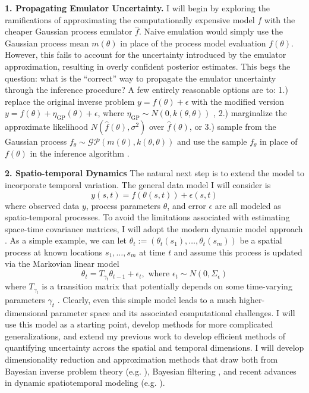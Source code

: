 \documentclass[12pt]{article}
\begin{document}
 \textbf{1. Propagating Emulator Uncertainty.} I will begin by exploring the ramifications of approximating the computationally expensive model $f$ with the  cheaper Gaussian process emulator $\hat{f}$. Naive emulation would simply use the Gaussian process mean $m(\theta)$ in place of the process model evaluation $f(\theta)$. However, this fails to account
 for the uncertainty introduced by the emulator approximation, resulting in overly confident posterior estimates. This begs the question: what is the ``correct'' way to propagate the emulator uncertainty through 
 the inference procedure? A few entirely reasonable options are to: 1.) replace the original inverse problem $y = f(\theta) + \epsilon$ with the modified version $y = f(\theta) + \eta_{\text{GP}}(\theta) + \epsilon$, 
 where $\eta_{\text{GP}} \sim N(0, k(\theta, \theta))$ \cite{Cleary}, 2.) marginalize the approximate likelihood $N(\hat{f}(\theta), \sigma^2)$ over $\hat{f}(\theta)$, or 3.) sample from the Gaussian process 
 $f_\theta \sim \mathcal{GP}(m(\theta), k(\theta, \theta))$ and use the sample $f_\theta$ in place of $f(\theta)$ in the inference algorithm \cite{Fer}. 
 
   \textbf{2. Spatio-temporal Dynamics}
   The natural next step is to extend the model to incorporate temporal variation. The general data model I will consider is 
  \[y(s, t) = f(\theta(s, t)) + \epsilon(s, t)\]
  where observed data $y$, process parameters $\theta$, and error $\epsilon$ are all modeled as spatio-temporal processes. 
  To avoid the limitations associated with estimating space-time covariance matrices, I will adopt the modern dynamic model approach \cite{Arab}. As a simple example, 
  we can let $\theta_t := (\theta_t (s_1), \dots, \theta_t (s_m))$ be a spatial process at known locations $s_1, \dots, s_m$ at time $t$ and assume this process is updated
  via the Markovian linear model
  \[\theta_t = T_{\gamma_t} \theta_{t - 1} + \epsilon_t, \text{ where } \epsilon_t \sim N(0, \Sigma_\epsilon)\]
  where $T_{\gamma_t}$ is a transition matrix that potentially depends on some time-varying parameters $\gamma_t$ \cite{Arab}. Clearly, even this simple model leads to a 
  much higher-dimensional parameter space and its associated computational challenges. I will use this model as a starting point, develop methods for more
  complicated generalizations, and extend my previous work to develop efficient methods of quantifying uncertainty across the spatial and temporal dimensions. 
  I will develop dimensionality reduction and approximation methods that draw both from Bayesian inverse problem theory (e.g. \cite{Kugler}), Bayesian filtering \cite{Sarkka},
  and recent advances in dynamic spatiotemporal modeling (e.g. \cite{Hefley}). 
 
\end{document}
